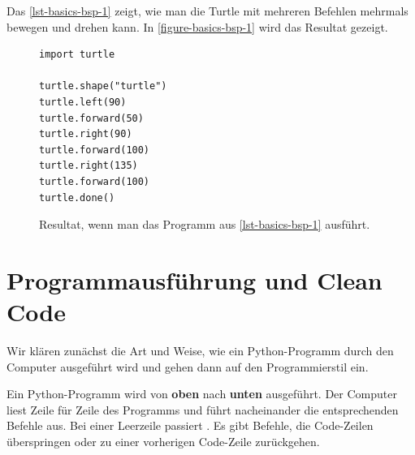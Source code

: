 \begin{example}

Das \autoref{lst-basics-bsp-1} zeigt, wie man die Turtle mit mehreren Befehlen mehrmals bewegen und drehen kann. In \autoref{figure-basics-bsp-1} wird das Resultat gezeigt.

\begin{figure}[htb]
\centering
\begin{minipage}{0.5\linewidth}
\centering
\begin{lstlisting}[caption={Beispielprogramm, welches die Figur aus \autoref{figure-basics-bsp-1} zeichnet (\graybgtexttt{bsp\_1.py}).}, label=lst-basics-bsp-1, showspaces=true]
import turtle

turtle.shape("turtle")
turtle.left(90)
turtle.forward(50)
turtle.right(90)
turtle.forward(100)
turtle.right(135)
turtle.forward(100)
turtle.done()
\end{lstlisting}
\end{minipage}
\hfill
\begin{minipage}[c]{0.4\linewidth}
\centering
{}
\caption{Resultat, wenn man das Programm aus \autoref{lst-basics-bsp-1} ausführt.}
\label{figure-basics-bsp-1}
\end{minipage}
\end{figure}

\end{example}

\section{Programmausführung und Clean Code}

Wir klären zunächst die Art und Weise, wie ein Python-Programm durch den Computer ausgeführt wird und gehen dann auf den Programmierstil ein.

\begin{definition}[Programmausführung]
Ein Python-Programm wird von \textbf{oben} nach \textbf{unten} ausgeführt. Der Computer liest Zeile für Zeile des Programms und führt nacheinander die entsprechenden Befehle aus. Bei einer Leerzeile passiert . Es gibt Befehle, die Code-Zeilen überspringen oder zu einer vorherigen Code-Zeile zurückgehen.
\end{definition}

